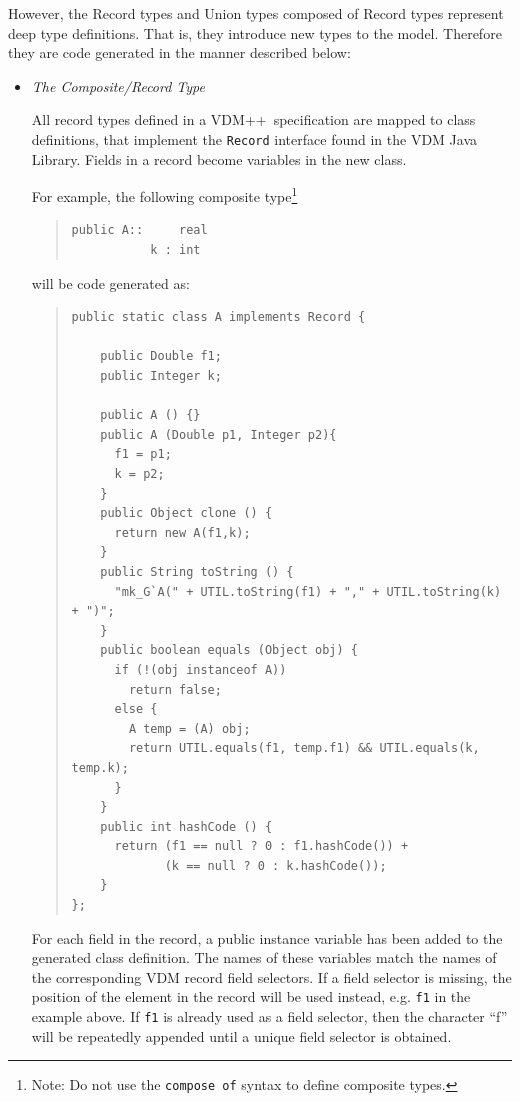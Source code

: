 \documentclass[\pformat,11pt]{article}
\newcommand{\VDM}{VDM++}
\newcommand{\JL}{VDM Java Library}
\begin{document}
However, the Record types and Union types composed of
Record types represent deep type definitions. That is, they introduce
new types to the model. Therefore they are code generated in the
manner described below: 
\begin{itemize}
\item {\em The Composite/Record Type}
    
  All record types defined in a \VDM\ specification are mapped to
  class definitions, that implement the {\tt Record} interface found
  in the \JL{}.  Fields in a record become variables in the new class.

For example, the following composite type\footnote{Note: Do not use the {\tt compose of} syntax to define composite types.}

\begin{quote}
\begin{verbatim}
public A::     real
           k : int
\end{verbatim}
\end{quote}

will be code generated as:
\begin{quote}
\begin{small}
\begin{verbatim}
public static class A implements Record {

    public Double f1;
    public Integer k;

    public A () {}
    public A (Double p1, Integer p2){
      f1 = p1;
      k = p2;
    }
    public Object clone () {
      return new A(f1,k);
    }
    public String toString () {
      "mk_G`A(" + UTIL.toString(f1) + "," + UTIL.toString(k) + ")";
    }
    public boolean equals (Object obj) {
      if (!(obj instanceof A))
        return false;
      else {
        A temp = (A) obj;
        return UTIL.equals(f1, temp.f1) && UTIL.equals(k, temp.k);
      }
    }
    public int hashCode () {
      return (f1 == null ? 0 : f1.hashCode()) + 
             (k == null ? 0 : k.hashCode());
    } 
};
\end{verbatim}
\end{small}  
\end{quote}

For each field in the record, a public instance variable has been
added to the generated class definition. The names of these variables
match the names of the corresponding VDM record field selectors.  
If a field selector is missing, the position of the element in the
record will be used instead, e.g. \verb+f1+ in the example above. If
\verb+f1+ is already used as a field selector, then the character
``f'' will be repeatedly appended until a unique field selector is obtained.


\end{itemize}
\end{document}
